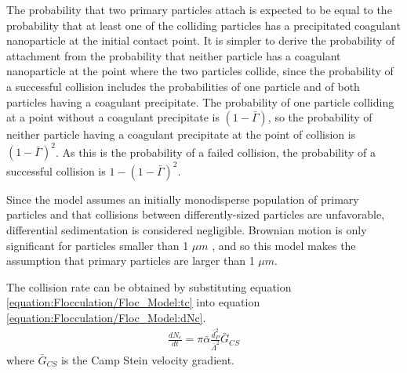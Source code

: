 \documentclass[letterpaper,10pt,english]{sphinxmanual}
\begin{document}
The probability that two primary particles attach is expected to be equal to the probability that at least one of the colliding particles has a precipitated coagulant nanoparticle at the initial contact point. It is simpler to derive the probability of attachment from the probability that neither particle has a coagulant nanoparticle at the point where the two particles collide, since the probability of a successful collision includes the probabilities of one particle and of both particles having a coagulant precipitate. The probability of one particle colliding at a point without a coagulant precipitate is \((1-\bar{\Gamma})\), so the probability of neither particle having a coagulant precipitate at the point of collision is \((1-\bar{\Gamma})^2\). As this is the probability of a failed collision, the probability of a successful collision is \(1-(1-\bar{\Gamma})^2\).

Since the model assumes an initially monodisperse population of primary particles and that collisions between differently-sized particles are unfavorable, differential sedimentation is considered negligible.  Brownian motion is only significant for particles smaller than 1 \(\mu m\) \label{\detokenize{Flocculation/Floc_Model:id1}}{\hyperref[\detokenize{Flocculation/Floc_Model:floc-model-benjamin-water-2013}]{\sphinxcrossref{{[}BL13{]}}}}, and so this model makes the assumption that primary particles are larger than 1 \(\mu m\).

The collision rate \label{\detokenize{Flocculation/Floc_Model:id2}}{\hyperref[\detokenize{Flocculation/Floc_Model:floc-model-pennock-theoretical-2016}]{\sphinxcrossref{{[}PCWSL16{]}}}} can be obtained by substituting equation \eqref{equation:Flocculation/Floc_Model:tc} into equation \eqref{equation:Flocculation/Floc_Model:dNc}.
\begin{equation}\label{equation:Flocculation/Floc_Model:Nclam}
\begin{split}       \frac{dN_{c}}{dt}=\pi\bar{\alpha}\frac{\bar{d}_{P}^2}{\bar \Lambda^2} \bar G_{CS}\end{split}
\end{equation}
where \(\bar G_{CS}\) is the Camp Stein velocity gradient.
\end{document}
